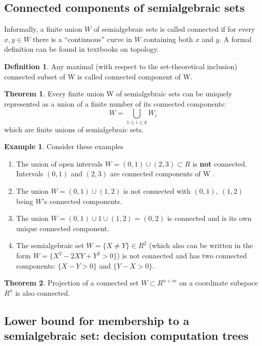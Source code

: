 \documentclass{article}
\theoremstyle{definition}
\newtheorem{definition}{Definition}[section]
\newtheorem{theorem}{Theorem}[section]
\newtheorem{example}{Example}[section]
\begin{document}
\subsection{Connected components of semialgebraic sets}
Informally, a finite union $W$ of semialgebraic sets is called connected
if for every $x, y \in W$ there is a “continuous” curve in $W$ containing both $x$ and $y$.
A formal definition can be found in textbooks on topology.

\begin{definition}
    Any maximal (with respect to the set-theoretical inclusion) connected subset of W is called connected component of W.
\end{definition}

\begin{theorem}
    Every finite union W of semialgebraic sets can be uniquely represented as a union of a finite number of its connected components:
    $$W = \bigcup\limits_{1\leq i \leq k} W_i$$
    which are finite unions of semialgebraic sets.
\end{theorem}

\begin{example}
    Consider these examples
    \begin{enumerate}
        \item The union of open intervals $W = (0, 1) \cup (2, 3) \subset R$ is \textbf{not} connected.
            Intervals $(0, 1)$ and $(2, 3)$ are connected components of W .
        \item The union $W = (0, 1) \cup (1, 2)$ is not connected with $(0, 1),\ (1, 2)$ being $W$’s connected components.
        \item The union $W = (0, 1) \cup 1 \cup (1, 2) = (0, 2)$ is connected and is its own unique connected component.
        \item The semialgebraic set $W = \{X \neq Y \} \in R^2$
            (which also can be written in the form $W = \{X^2 − 2XY + Y^2 > 0\}$)
            is not connected and has two connected components: $\{X − Y > 0\}$ and $\{Y − X > 0\}$.
    \end{enumerate}
\end{example}

\begin{theorem}
    Projection of a connected set $W \subset R^{n+m}$ on a coordinate subspace $R^n$ is also connected.
\end{theorem}

\subsection{Lower bound for membership to a semialgebraic set: decision computation trees}
\end{document}

